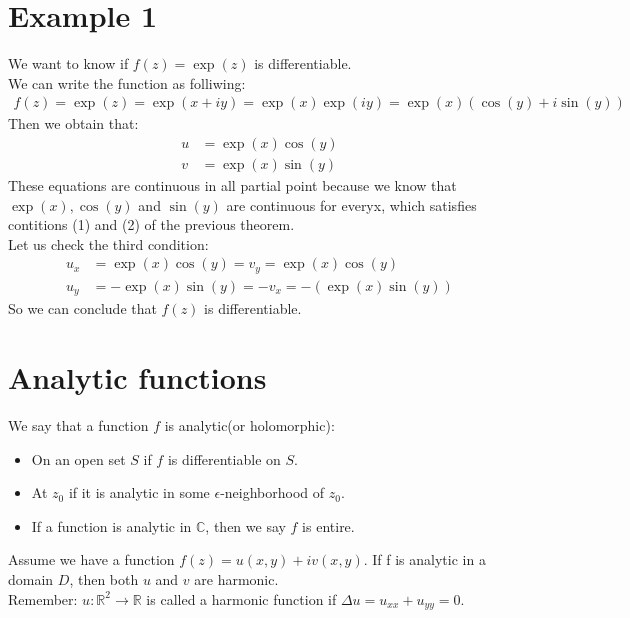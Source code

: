 \documentclass{report}
\def\C{\mathbb{C}}
\def\R{\mathbb{R}}
\renewcommand{\exp}[1]{\operatorname{exp}\left(#1\right)}
\begin{document}
    \section*{Example 1}
    We want to know if $f(z) = \exp{z}$ is differentiable. \\
    We can write the function as folliwing:
    \begin{align*}
        f(z) = \exp{z} = \exp{x+iy} = \exp{x}\exp{iy} = \exp{x}(\cos(y) + i\sin(y))
    \end{align*}
    Then we obtain that:
    \begin{align*}
        u &= \exp{x}\cos(y) \\
        v &= \exp{x}\sin(y)
    \end{align*}
    \noindent
    These equations are continuous in all partial point because we know that $\exp{x}, \cos(y)$ and $\sin(y)$ are continuous for everyx, which satisfies contitions (1) and (2) of the previous theorem.
    \\ Let us check the third condition:
    \begin{align*}
        u_x &= \exp{x}\cos(y) = v_y = \exp{x}\cos(y) \\
        u_y &= -\exp{x}\sin(y) = -v_x = -(\exp{x}\sin(y))
    \end{align*}
    So we can conclude that $f(z)$ is differentiable.\\
    
    \section*{Analytic functions}
    We say that a function $f$ is analytic(or holomorphic):
    \begin{itemize}
        \item On an open set $S$ if $f$ is differentiable on $S$.
        \item At $z_0$ if it is analytic in some $\epsilon$-neighborhood of $z_0$.
        \item If a function is analytic in $\C$, then we say $f$ is entire.
    \end{itemize}

    \begin{tcolorbox}[title=Theorem]
        Assume we have a function $f(z) = u(x,y) + iv(x,y)$. If f is analytic in a domain $D$, then both $u$ and $v$ are harmonic.\\
        Remember: $u\colon\R^2 \longrightarrow \R$ is called a harmonic function if $\Delta u = u_{xx} + u_{yy} = 0$.
    \end{tcolorbox}
\end{document}
